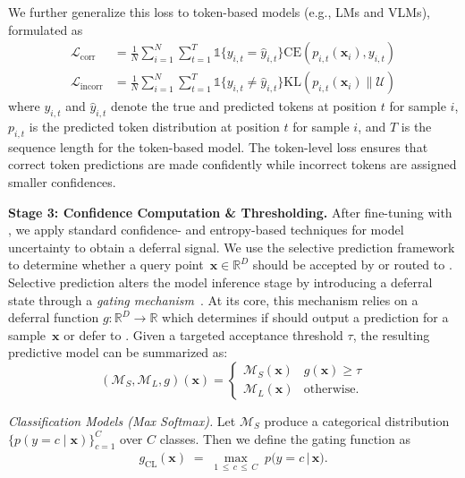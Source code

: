 We further generalize this loss to token-based models (e.g., LMs and VLMs), formulated as %
\begin{align}
    \mathcal{L}_\text{corr} & = \frac{1}{N} \sum_{i=1}^{N} \sum_{t=1}^{T} \mathds{1}\{ y_{i,t} = \hat{y}_{i,t} \} \text{CE}(p_{i,t}(\mathbf{x}_i), y_{i,t}) \\
    \mathcal{L}_\text{incorr} & = \frac{1}{N} \sum_{i=1}^{N} \sum_{t=1}^{T} \mathds{1}\{ y_{i,t} \neq \hat{y}_{i,t} \} \text{KL}\left(p_{i,t}(\mathbf{x}_i) \parallel \mathcal{U}\right)
\end{align}
\normalsize
where \( y_{i,t} \) and \( \hat{y}_{i,t} \) denote the true and predicted tokens at position \( t \) for sample \( i \), \( p_{i,t} \) is the predicted token distribution at position \( t \) for sample \( i \), and \( T \) is the sequence length for the token-based model. The token-level loss ensures that correct token predictions are made confidently while incorrect tokens are assigned smaller confidences.

\sloppy
\textbf{Stage 3: Confidence Computation \& Thresholding.} After fine-tuning \smallmodel with \loss, we apply standard confidence- and entropy-based techniques for model uncertainty to obtain a deferral signal. We use the selective prediction framework to determine whether a query point~$\mathbf{x} \in \mathbb{R}^D$ should be accepted by \smallmodel or routed to \bigmodel. Selective prediction alters the model inference stage by introducing a deferral state through a \textit{gating mechanism}~\citep{yaniv2010riskcoveragecurve}. At its core, this mechanism relies on a deferral function $g:\mathbb{R}^D \rightarrow \mathbb{R}$ which determines if \smallmodel should output a prediction for a sample~$\mathbf{x}$ or defer to \bigmodel. Given a targeted acceptance threshold $\tau$, the resulting predictive model can be summarized as:
\begin{equation}
\label{eq:deferral}
    (\mathcal{M}_S,\mathcal{M}_L,g)(\mathbf{x}) = \begin{cases}
  \mathcal{M}_S(\mathbf{x})  & g(\mathbf{x}) \geq \tau \\
  \mathcal{M}_L(\mathbf{x}) & \text{otherwise.}
\end{cases}
\end{equation}

\emph{Classification Models (Max Softmax).} Let \(\mathcal{M}_S\) produce a categorical distribution
\(\{p(y=c \mid \mathbf{x})\}_{c=1}^C\) over \(C\) classes. 
Then we define the gating function as
\begin{align}
g_{\text{CL}}(\mathbf{x}) \;=\; \max_{1 \,\le\, c \,\le\, C}\;p\bigl(y = c \,\big\vert\, \mathbf{x}\bigr).
\end{align}

